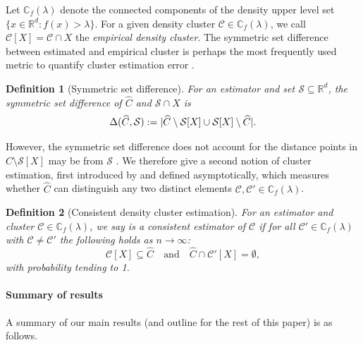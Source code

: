 \documentclass{article}
\DeclarePairedDelimiter\abs{\lvert}{\rvert}
\newcommand{\Reals}{\mathbb{R}}
\newcommand{\Rd}{\Reals^d}
\newcommand{\1}{\mathbf{1}}
\newcommand{\Xbf}{X}             %
\newcommand{\Cbb}{\mathbb{C}}
\newcommand{\Cset}{\mathcal{C}}
\newcommand{\Cest}{\widehat{C}}
\theoremstyle{aldenthm}
\newtheorem{definition}{Definition}
\theoremstyle{aldenrmrk}
\begin{document}
Let $\Cbb_f(\lambda)$ denote the connected components of the density upper level
set $\{x \in \Rd: f(x) > \lambda\}$.  For a given density cluster $\Cset \in
\Cbb_f(\lambda)$, we call $\Cset[\Xbf] = \Cset \cap \Xbf$ the \emph{empirical
density cluster}. The symmetric set difference between estimated and empirical cluster is perhaps the most frequently used metric to quantify cluster estimation error \citep{korostelev2012,polonik1995,rigollet2009}.

\begin{definition}[Symmetric set difference]
	\label{def: symmetric_set_diff}
	For an estimator \smash{$\Cest \subseteq \Xbf$} and set
	$\mathcal{S} \subseteq \Reals^d$, the symmetric set difference of $\Cest$ and $\mathcal{S} \cap \Xbf$ is 
	\begin{equation}
	\label{eqn: misclassification_rate}
	\Delta(\Cest, \mathcal{S}) := \abs{\Cest \setminus \mathcal{S}[\Xbf] \cup \mathcal{S}[\Xbf] \setminus \Cest}.
	\end{equation}
\end{definition}

However, the symmetric set difference does not account for the distance points in $\widehat{C} \setminus \mathcal{S}[\Xbf]$ may be from $\mathcal{S}$ \citep{singh2009}. We therefore give a second notion of cluster estimation, first introduced by \citet{hartigan1981} and defined asymptotically, which measures whether $\widehat{C}$ can distinguish any two distinct elements $\Cset, \Cset' \in \Cbb_f(\lambda)$. 

\begin{definition}[Consistent density cluster estimation]
	\label{def: consistent_density_cluster_estimation}
	For an estimator \smash{$\Cest \subseteq \Xbf$} and cluster 
	$\Cset \in \Cbb_f(\lambda)$, we say \smash{$\Cest$} is a consistent
	estimator of $\Cset$ if for all $\Cset' \in \Cbb_f(\lambda)$ with $\Cset \not=
	\Cset'$ the following holds as $n \to \infty$: 
	\begin{equation}
	\label{eqn: consistent_density_cluster_recovery}
	\Cset[\Xbf] \subseteq \Cest \quad \text{and} \quad
	\Cest \cap \Cset'[\Xbf] = \emptyset,
	\end{equation}
	with probability tending to 1.
\end{definition}
\paragraph{Summary of results}
A summary of our main results (and outline for the rest of this paper) is as
follows.  
\end{document}
